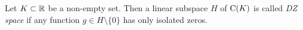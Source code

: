 \begin{definition}[DZ space]
Let $K\subset \mathbb{R}$ be a non-empty set. Then a linear subspace $H$ of $\operatorname{C}(K)$ is called \emph{DZ space} if any function $g\in H\setminus\{0\}$ has only isolated zeros.
\end{definition}